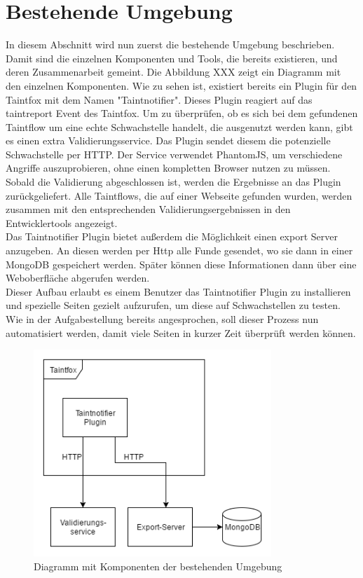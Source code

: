 \section{Bestehende Umgebung}
In diesem Abschnitt wird nun zuerst die bestehende Umgebung beschrieben. Damit sind die einzelnen Komponenten und Tools, die bereits existieren, und deren Zusammenarbeit gemeint. Die Abbildung XXX zeigt ein Diagramm mit den einzelnen Komponenten. Wie zu sehen ist, existiert bereits ein Plugin für den Taintfox mit dem Namen "Taintnotifier". Dieses Plugin reagiert auf das taintreport Event des Taintfox. Um zu überprüfen, ob es sich bei dem gefundenen Taintflow um eine echte Schwachstelle handelt, die ausgenutzt werden kann, gibt es einen extra Validierungsservice. Das Plugin sendet diesem die potenzielle Schwachstelle per HTTP. Der Service verwendet PhantomJS, um verschiedene Angriffe auszuprobieren, ohne einen kompletten Browser nutzen zu müssen. Sobald die Validierung abgeschlossen ist, werden die Ergebnisse an das Plugin zurückgeliefert. Alle Taintflows, die auf einer Webseite gefunden wurden, werden zusammen mit den entsprechenden Validierungsergebnissen in den Entwicklertools angezeigt. \\
Das Taintnotifier Plugin bietet außerdem die Möglichkeit einen export Server anzugeben. An diesen werden per Http alle Funde gesendet, wo sie dann in einer MongoDB gespeichert werden. Später können diese Informationen dann über eine Weboberfläche abgerufen werden. \\
Dieser Aufbau erlaubt es einem Benutzer das Taintnotifier Plugin zu installieren und spezielle Seiten gezielt aufzurufen, um diese auf Schwachstellen zu testen. Wie in der Aufgabestellung bereits angesprochen, soll dieser Prozess nun automatisiert werden, damit viele Seiten in kurzer Zeit überprüft werden können.

\begin{figure}[H]
	\centering
		\includegraphics[width=0.8\textwidth]{Bilder/AlteUmgebung.png}
	\caption{Diagramm mit Komponenten der bestehenden Umgebung}
\end{figure}

